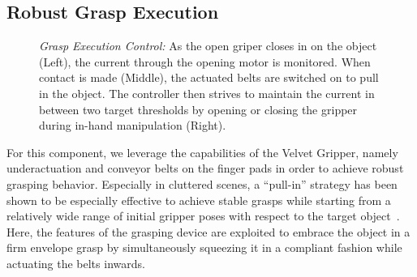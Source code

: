\subsection{Robust Grasp Execution}
\label{subsec:grasp_execution}
%
\begin{figure}[!t]
 \centering
   \caption{\textit{Grasp Execution Control:} As the open griper closes in on the object (Left), the
     current through the opening motor is monitored. When contact is made (Middle), the actuated
     belts are switched on to pull in the object. The controller then strives to maintain the
     current in between two target thresholds by opening or closing the gripper during in-hand
     manipulation (Right).}
   \label{fig:pull_in_control}
 \centering
\end{figure}
%
For this component, we leverage the capabilities of the Velvet Gripper, namely underactuation and
conveyor belts on the finger pads in order to achieve robust grasping behavior. Especially in
cluttered scenes, a ``pull-in'' strategy has been shown to be especially effective to achieve stable
grasps while starting from a relatively wide range of initial gripper poses with respect to the
target object~\cite{Krug14a}. Here, the features of the grasping device are exploited to embrace the
object in a firm envelope grasp by simultaneously squeezing it in a compliant fashion while
actuating the belts inwards.

